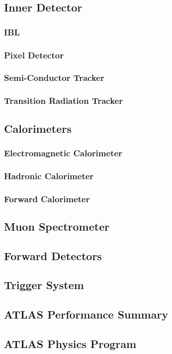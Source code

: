 \subsection{Inner Detector}

\subsubsection*{IBL}

\subsubsection*{Pixel Detector}


\subsubsection*{Semi-Conductor Tracker}


\subsubsection*{Transition Radiation Tracker}



\subsection{Calorimeters}

\subsubsection*{Electromagnetic Calorimeter}


\subsubsection*{Hadronic Calorimeter}


\subsubsection*{Forward Calorimeter}


\subsection{Muon Spectrometer}


\subsection{Forward Detectors}

\subsection{Trigger System}
\label{sec:cern:trigger}

\subsection{ATLAS Performance Summary}


\subsection{ATLAS Physics Program}